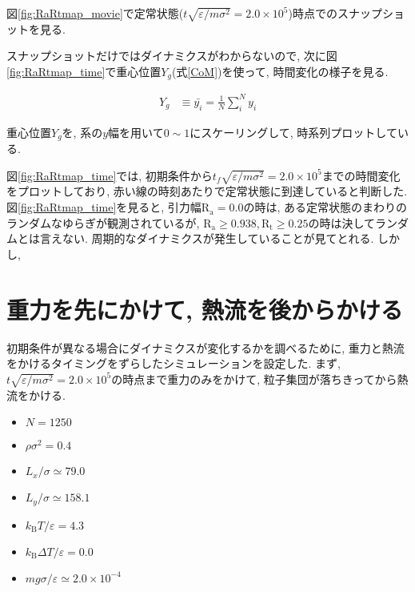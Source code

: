 図\ref{fig:RaRtmap_movie}で定常状態($t\sqrt{\varepsilon / m \sigma^2} = 2.0 \times 10^{5}$)時点でのスナップショットを見る.



スナップショットだけではダイナミクスがわからないので, 次に図\ref{fig:RaRtmap_time}で重心位置$Y_g$(式\eqref{CoM})を使って, 時間変化の様子を見る. 

\begin{align}
  \label{CoM}
  Y_g &\equiv \bar{y_i} = \frac{1}{N} \sum_{i}^{N} y_i
\end{align}

重心位置$Y_g$を, 系の$y$幅を用いて$0\sim 1$にスケーリングして, 時系列プロットしている.



図\ref{fig:RaRtmap_time}では, 初期条件から$t_f \sqrt{\varepsilon / m \sigma^2} = 2.0 \times 10^{5}$までの時間変化をプロットしており, 赤い線の時刻あたりで定常状態に到達していると判断した. 図\ref{fig:RaRtmap_time}を見ると, 引力幅$\text{R}_\text{a}=0.0$の時は, ある定常状態のまわりのランダムなゆらぎが観測されているが, $\text{R}_\text{a} \ge 0.938, \text{R}_\text{t} \ge 0.25$の時は決してランダムとは言えない. 周期的なダイナミクスが発生していることが見てとれる. しかし, 

\section{重力を先にかけて, 熱流を後からかける}\label{sec:RaRtmap_drop}

初期条件が異なる場合にダイナミクスが変化するかを調べるために, 重力と熱流をかけるタイミングをずらしたシミュレーションを設定した. まず, $t \sqrt{\varepsilon / m \sigma^2} = 2.0 \times 10^{5}$の時点まで重力のみをかけて, 粒子集団が落ちきってから熱流をかける. 

\begin{itemize}
  \item $N = 1250$
  \item $\rho \sigma^2 = 0.4$
  \item $L_x / \sigma \simeq 79.0$
  \item $L_y / \sigma \simeq 158.1$
  \item $k_{\text{B}} T/\varepsilon = 4.3$
  \item $k_{\text{B}} \Delta T/\varepsilon = 0.0$
  \item $mg\sigma/\varepsilon \simeq 2.0 \times 10^{-4}$
\end{itemize}

